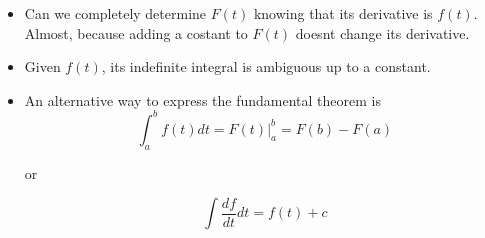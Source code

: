 \documentclass[../main.tex]{subfiles}
\begin{document}
\begin{itemize}
    \item Can we completely determine $F(t)$ knowing that its derivative is
        $f(t)$. Almost, because adding a costant to $F(t)$ doesnt change its
        derivative.

    \item Given $f(t)$, its indefinite integral is ambiguous up to a constant.

    \item An alternative way to express the fundamental theorem is
        \begin{equation}
            \int_a^b f(t) dt = F(t)|_a^b = F(b) - F(a)
        \end{equation}

        or

        \begin{equation}
            \int \frac{df}{dt}dt = f(t) + c
        \end{equation}

\end{itemize}
\end{document}

